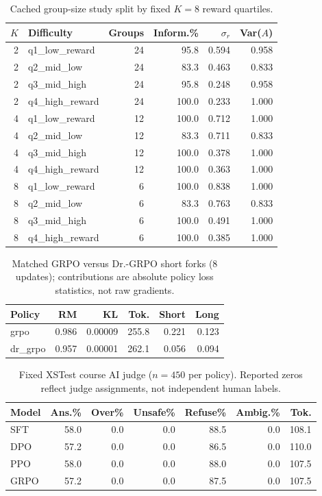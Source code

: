 \begin{table}[!htbp]
\centering
\caption{Cached group-size study split by fixed $K=8$ reward quartiles.}
\label{tab:grpo-difficulty}
\scriptsize
\setlength{\tabcolsep}{3.4pt}
\begin{tabular}{rlrrrr}
\toprule
$K$ & Difficulty & Groups & Inform.\% & $\sigma_r$ & Var($A$) \\
\midrule
2 & q1\_low\_reward & 24 & 95.8 & 0.594 & 0.958 \\
2 & q2\_mid\_low & 24 & 83.3 & 0.463 & 0.833 \\
2 & q3\_mid\_high & 24 & 95.8 & 0.248 & 0.958 \\
2 & q4\_high\_reward & 24 & 100.0 & 0.233 & 1.000 \\
4 & q1\_low\_reward & 12 & 100.0 & 0.712 & 1.000 \\
4 & q2\_mid\_low & 12 & 83.3 & 0.711 & 0.833 \\
4 & q3\_mid\_high & 12 & 100.0 & 0.378 & 1.000 \\
4 & q4\_high\_reward & 12 & 100.0 & 0.363 & 1.000 \\
8 & q1\_low\_reward & 6 & 100.0 & 0.838 & 1.000 \\
8 & q2\_mid\_low & 6 & 83.3 & 0.763 & 0.833 \\
8 & q3\_mid\_high & 6 & 100.0 & 0.491 & 1.000 \\
8 & q4\_high\_reward & 6 & 100.0 & 0.385 & 1.000 \\
\bottomrule
\end{tabular}
\end{table}

\begin{table}[!htbp]
\centering
\caption{Matched GRPO versus Dr.-GRPO short forks (8 updates); contributions are absolute policy loss statistics, not raw gradients.}
\label{tab:grpo-norm}
\scriptsize
\setlength{\tabcolsep}{3.4pt}
\begin{tabular}{lrrrrr}
\toprule
Policy & RM & KL & Tok. & Short & Long \\
\midrule
grpo & 0.986 & 0.00009 & 255.8 & 0.221 & 0.123 \\
dr\_grpo & 0.957 & 0.00001 & 262.1 & 0.056 & 0.094 \\
\bottomrule
\end{tabular}
\end{table}

\begin{table}[!htbp]
\centering
\caption{Fixed XSTest course AI judge ($n=450$ per policy). Reported zeros reflect judge assignments, not independent human labels.}
\label{tab:safety}
\scriptsize
\setlength{\tabcolsep}{3.4pt}
\begin{tabular}{lrrrrrr}
\toprule
Model & Ans.\% & Over\% & Unsafe\% & Refuse\% & Ambig.\% & Tok. \\
\midrule
SFT & 58.0 & 0.0 & 0.0 & 88.5 & 0.0 & 108.1 \\
DPO & 57.2 & 0.0 & 0.0 & 86.5 & 0.0 & 110.0 \\
PPO & 58.0 & 0.0 & 0.0 & 88.0 & 0.0 & 107.5 \\
GRPO & 57.2 & 0.0 & 0.0 & 87.5 & 0.0 & 107.5 \\
\bottomrule
\end{tabular}
\end{table}

